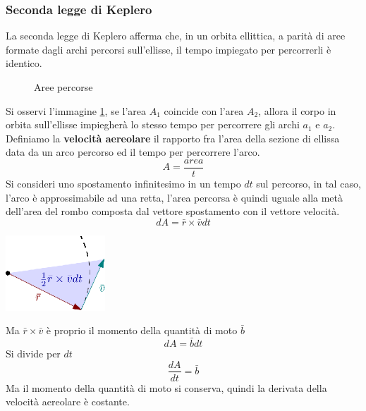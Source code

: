 \documentclass[10pt, letterpaper]{report}
\begin{document}
\subsubsection{Seconda legge di Keplero}
La seconda legge di Keplero afferma che, in un orbita ellittica, a parità di 
aree formate dagli archi percorsi sull'ellisse, il tempo impiegato per percorrerli 
è identico.\acc \begin{figure}[h]
    \caption{Aree percorse}
    \label{fig:areePer}
\end{figure}
Si osservi l'immagine \ref{fig:areePer}, se l'area $A_1$ coincide 
con l'area $A_2$, allora il corpo in orbita sull'ellisse impiegherà lo 
stesso tempo per percorrere gli archi $a_1$ e $a_2$.
\acc 
Definiamo la \textbf{velocità aereolare} il rapporto fra 
l'area della sezione di ellissa data da un arco 
percorso ed il tempo per percorrere l'arco.
$$ A=\frac{area}{t}$$
Si consideri uno spostamento infinitesimo in un tempo 
$dt$ sul percorso, 
in tal caso, l'arco è approssimabile ad una retta, l'area 
percorsa è quindi uguale alla metà dell'area del rombo composta dal vettore 
spostamento con il vettore velocità.
$$ dA=\bar r \times \bar v dt$$
\begin{center}
    \includegraphics[width=0.28\textwidth ]{images/spostInfinitesimo.eps}
\end{center}
Ma $\bar r\times \bar v$ è proprio il momento della quantità di moto $\bar b$
$$ dA=\bar b dt$$
Si divide per $dt$ 
$$ \dfrac{dA}{dt}=\bar b $$
Ma il momento della quantità di moto si conserva, quindi 
la derivata della velocità aereolare è costante.
\flowerLine 
\end{document}
